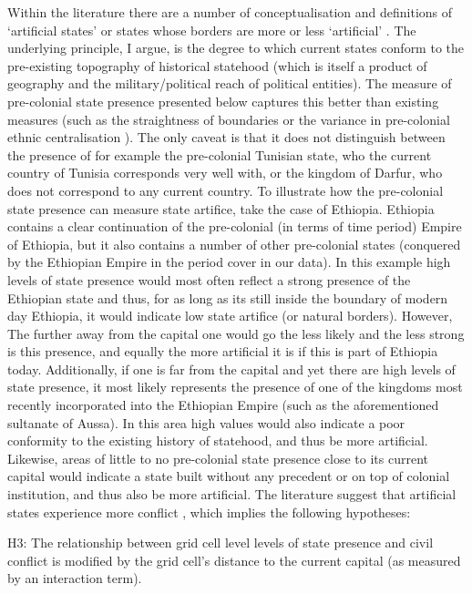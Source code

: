 \documentclass[12pt]{article}
\begin{document}
Within the literature there are a number of conceptualisation and definitions of
`artificial states' or states whose borders are more or less `artificial'
\citep{Alesina2011, Clapham1996, Englebert2002, Herbst2014}. The underlying
principle, I argue, is the degree to which current states conform to the
pre-existing topography of historical statehood (which is itself a product of
geography and the military/political reach of political entities). The measure
of pre-colonial state presence presented below captures this better than
existing measures (such as the straightness of boundaries \citep{Alesina2011} or
the variance in pre-colonial ethnic centralisation \citep{Englebert2002}). The
only caveat is that it does not distinguish between the presence of for example
the pre-colonial Tunisian state, who the current country of Tunisia corresponds
very well with, or the kingdom of Darfur, who does not correspond to any current
country. To illustrate how the pre-colonial state presence can measure state
artifice, take the case of Ethiopia. Ethiopia contains a clear continuation of
the pre-colonial (in terms of time period) Empire of Ethiopia, but it also
contains a number of other pre-colonial states (conquered by the Ethiopian
Empire in the period cover in our data). In this example high levels of state
presence would most often reflect a strong presence of the Ethiopian state and
thus, for as long as its still inside the boundary of modern day Ethiopia, it
would indicate low state artifice (or natural borders). However, The further
away from the capital one would go the less likely and the less strong is this
presence, and equally the more artificial it is if this is part of Ethiopia
today. Additionally, if one is far from the capital and yet there are high
levels of state presence, it most likely represents the presence of one of the
kingdoms most recently incorporated into the Ethiopian Empire (such as the
aforementioned sultanate of Aussa). In this area high values would also indicate
a poor conformity to the existing history of statehood, and thus be more
artificial.  Likewise, areas of little to no pre-colonial state presence close
to its current capital would indicate a state built without any precedent or on
top of colonial institution, and thus also be more artificial. The literature
suggest that artificial states experience more conflict 
\citep{Alesina2011, Englebert2002}, which implies the following hypotheses:

H3: The relationship between grid cell level levels of state presence and civil
conflict is modified by the grid cell's distance to the current capital (as
measured by an interaction term).
\end{document}
